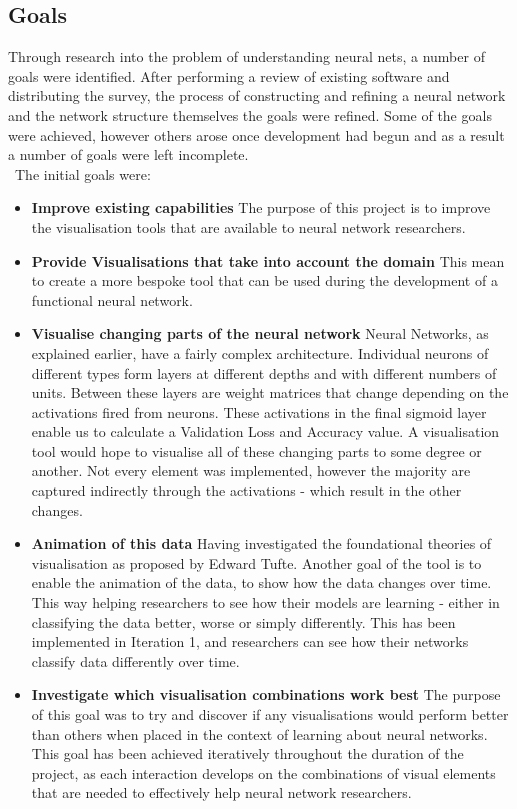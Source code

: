 \documentclass[a4paper,11pt,titlepage]{article}
\begin{document}
	\subsection{Goals}	
	Through research into the problem of understanding neural nets, a number of goals were identified. After performing a review of existing software and distributing the survey, the process of constructing and refining a neural network and the network structure themselves the goals were refined. Some of the goals were achieved, however others arose once development had begun and as a result a number of goals were left incomplete. 
\\\
The initial goals were:
	\begin{itemize}
		\item \textbf{Improve existing capabilities}
		The purpose of this project is to improve the visualisation tools that are available to neural network researchers.
		\item \textbf{Provide Visualisations that take into account the domain}
			 This mean to create a more bespoke tool that can be used during the development of a functional neural network.
		\item \textbf{Visualise changing parts of the neural network}
			 Neural Networks, as explained earlier, have a fairly complex architecture. Individual neurons of different types form layers at different depths and with different numbers of units. Between these layers are weight matrices that change depending on the activations fired from neurons. These activations in the final sigmoid layer enable us to calculate a Validation Loss and Accuracy value. A visualisation tool would hope to visualise all of these changing parts to some degree or another. Not every element was implemented, however the majority are captured indirectly through the activations - which result in the other changes.
			 \item \textbf{Animation of this data} Having investigated the foundational theories of visualisation as proposed by Edward Tufte. Another goal of the tool is to enable the animation of the data, to show how the data changes over time. This way helping researchers to see how their models are learning - either in classifying the data better, worse or simply differently. This has been implemented in Iteration 1, and researchers can see how their networks classify data differently over time.
			\item \textbf{Investigate which visualisation combinations work best}
			The purpose of this goal was to try and discover if any visualisations would perform better than others when placed in the context of learning about neural networks. This goal has been achieved iteratively throughout the duration of the project, as each interaction develops on the combinations of visual elements that are needed to effectively help neural network researchers.

\end{itemize}
\end{document}
